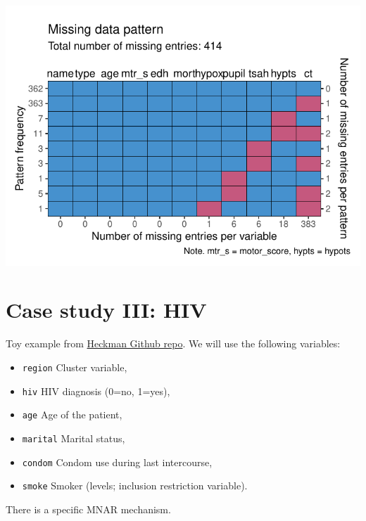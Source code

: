 \documentclass[
]{jss}
\providecommand{\tightlist}{%
  \setlength{\itemsep}{0pt}\setlength{\parskip}{0pt}}
\begin{document}
\begin{CodeChunk}
\begin{center}\includegraphics{Manuscript_files/figure-latex/impact-3} \end{center}

\end{CodeChunk}

\hypertarget{case-study-iii-hiv}{%
\section{Case study III: HIV}\label{case-study-iii-hiv}}

Toy example from
\href{https://github.com/johamunoz/Heckman-IPDMA/blob/main/Toy_example.R}{Heckman
Github repo}. We will use the following variables:

\begin{itemize}
\tightlist
\item
  \texttt{region} Cluster variable,
\item
  \texttt{hiv} HIV diagnosis (0=no, 1=yes),
\item
  \texttt{age} Age of the patient,
\item
  \texttt{marital} Marital status,
\item
  \texttt{condom} Condom use during last intercourse,
\item
  \texttt{smoke} Smoker (levels; inclusion restriction variable).
\end{itemize}

There is a specific MNAR mechanism.
\end{document}
